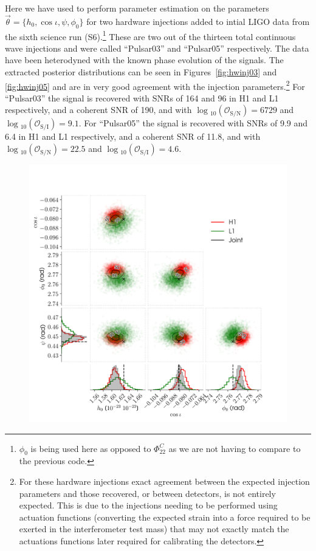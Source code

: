Here we have used \lppen to perform parameter estimation on the parameters $\vec{\theta} = \{h_0, \cos{\iota}, \psi, \phi_{0}\}$ for two hardware injections added
to intial LIGO data from the sixth science run (S6).\footnote{$\phi_0$ is being used here as opposed to $\Phi_{22}^C$ as we are not having to compare to the previous
code.} These are two out of the thirteen total continuous wave injections and were called ``Pulsar03'' and ``Pulsar05''
respectively. The data have been heterodyned with the known phase evolution of the signals. The extracted posterior distributions can be seen in
Figures~\ref{fig:hwinj03} and \ref{fig:hwinj05} and are in very good agreement with the injection parameters.\footnote{For these hardware injections
exact agreement between the expected injection parameters and those recovered, or between detectors, is not entirely expected. This is due to the
injections needing to be performed using actuation functions (converting the expected \gw strain into a force required to be exerted in the
interferometer test mass) that may not exactly match the actuations functions later required for calibrating the detectors.} For ``Pulsar03''
the signal is recovered with SNRs of 164 and 96 in H1 and L1 respectively, and a coherent SNR of 190, and with
$\log{}_{10}\left(\mathcal{O}_{\text{S}/\text{N}}\right) = 6729$ and $\log{}_{10}\left(\mathcal{O}_{\text{S}/\text{I}}\right) = 9.1$. For ``Pulsar05''
the signal is recovered with SNRs of 9.9 and 6.4 in H1 and L1 respectively, and a coherent SNR of 11.8, and with
$\log{}_{10}\left(\mathcal{O}_{\text{S}/\text{N}}\right) = 22.5$ and $\log{}_{10}\left(\mathcal{O}_{\text{S}/\text{I}}\right) = 4.6$.

\begin{figure}[!phtb]
\begin{center}
\includegraphics[width=1\columnwidth]{./figures/codeeval/simulations/S6_hwinj/hwinj03/hwinj03}
\caption{ \protect}
\end{center}
\end{figure}


